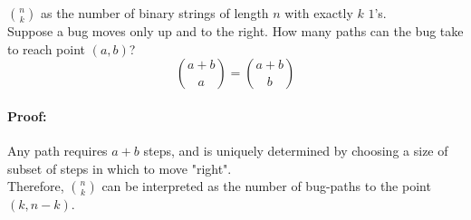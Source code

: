 \documentclass[a4paper, 11pt, twoside]{article}
\begin{document}
${n \choose k}$ as the number of binary strings of length $n$ with exactly $k$ $1$'s.\\

Suppose a bug moves only up and to the right. How many paths can the bug take to reach point $(a, b)$?\\

\[{a+b \choose a} = {a+b \choose b}\]

\paragraph{Proof:} Any path requires $a+b$ steps, and is uniquely determined by choosing a size of subset of steps in which to move "right".\\

Therefore, ${n \choose k}$ can be interpreted as the number of bug-paths to the point $(k, n-k)$.
\end{document}
